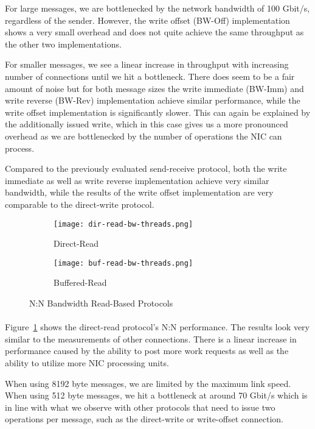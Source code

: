 For large messages, we are bottlenecked by the network bandwidth of 100 Gbit/s, regardless of 
the sender. However, the write offset (BW-Off) implementation shows a very small overhead and does not quite achieve the same 
throughput as the other two implementations. 

For smaller messages, we see a linear increase in throughput with increasing number of connections until we hit a bottleneck. 
There does seem to be a fair amount of noise
but for both message sizes the write immediate (BW-Imm) and write reverse (BW-Rev) implementation achieve similar performance,
while the write offset implementation is significantly slower. This can again be explained by the additionally issued write, 
which in this case  gives us a more pronounced overhead as we are bottlenecked by the number of operations the NIC can process.


Compared to the previously evaluated send-receive protocol, both the write immediate as well as write reverse implementation
achieve very 
similar bandwidth, while the results of the write offset implementation are very comparable to the direct-write protocol.


\begin{figure}[ht]
  \begin{subfigure}[b]{0.49\textwidth}
  \centering
  \texttt{[image: dir-read-bw-threads.png]}
  \caption{Direct-Read}
  \label{fig:plot-dirread-bw-threads}
  \end{subfigure}
  \begin{subfigure}[b]{0.49\textwidth}
  \centering
  \texttt{[image: buf-read-bw-threads.png]}
  \caption{Buffered-Read}
  \label{fig:plot-bufread-bw-threads}
  \end{subfigure}
  \caption{N:N Bandwidth Read-Based Protocols}
\end{figure}

\paragraph{}Figure~\ref{fig:plot-dirread-bw-threads} shows the direct-read protocol's N:N performance. 
The results look very similar to the measurements of
other connections. There is a linear increase in performance caused by the ability to post more work requests  
as well as the ability to utilize more NIC processing units.~\cite{anuj-guide}

When using 8192 byte messages, we are limited by the maximum link speed. When using 512 byte messages, we hit a bottleneck at
around 70 Gbit/s which is in line with what we observe with other protocols that need to issue two operations per message, 
such as the direct-write or write-offset connection.



